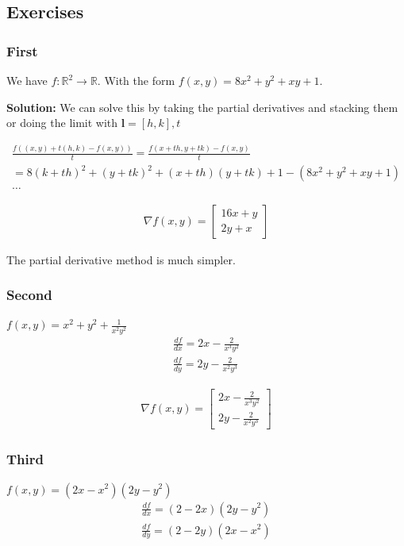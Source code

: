\documentclass[11pt]{article}
\begin{document}
\subsection{Exercises}
\subsubsection{First}
We have $f : \mathbb{R}^2 \to \mathbb{R}$.
With the form $f(x,y) = 8 x^2 + y^2 + x y + 1$.

\textbf{Solution: }
We can solve this by taking the partial derivatives and stacking them or doing the limit with $\textbf{l} = [h,k], t$

\begin{gather}
    \frac{f((x,y) + t(h,k) - f(x,y))}{t} = \frac{f(x+th, y+ tk) - f(x,y)}{t} \\ 
    = 8(k+th)^2 + (y+tk)^2 + (x+th)(y+tk) + 1 - (8 x^2 + y^2 + x y + 1) \\
    \dots
\end{gather}

\begin{align}
  \nabla f(x,y) = 
  \begin{bmatrix}
     16x + y \\ 2y + x
  \end{bmatrix}
\end{align}

The partial derivative method is much simpler.
\subsubsection{Second}
$f(x,y)= x^2 + y^2 + \frac{1}{x^2 y^2}$
\begin{gather}
    \frac{d f}{d x} = 2x - \frac{2}{x^3 y^2} \\
    \frac{d f}{d y} = 2y - \frac{2}{x^2 y^3} 
\end{gather}

\begin{align}
  \nabla f(x,y) = 
  \begin{bmatrix}
     2x - \frac{2}{x^3 y^2} \\ 2y - \frac{2}{x^2 y^3}
  \end{bmatrix}
\end{align}

\subsubsection{Third}
$f(x,y) = (2x - x^2)(2y-y^2)$
\begin{gather}
    \frac{d f}{d x} = (2 - 2x)(2y - y^2) \\
    \frac{d f}{d y} = (2 - 2y)(2x - x^2)
\end{gather}
\end{document}
